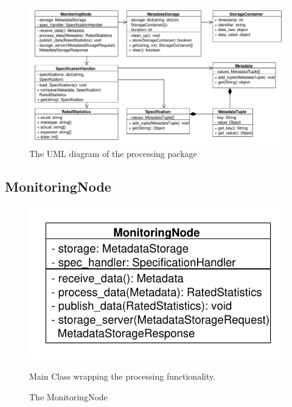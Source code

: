 \begin{figure}[!ht]
\begin{center}
\includegraphics[width=1.0\linewidth]{./diagram_pictures/processing.pdf}
\caption{The UML diagram of the processing package}
\end{center}
\end{figure}

\mbox{}

\newpage

\subsection{MonitoringNode}
\begin{figure}[htbp]
	\begin{minipage}[t]{7cm}
		\vspace{0pt}
		\centering
		\includegraphics[scale=0.6]{./diagram_pictures/MonitoringNode.pdf}
		\caption{The MonitoringNode}
	\end{minipage}
	\hfill
	\begin{minipage}[t]{8cm}
		\vspace{10pt}
		Main Class wrapping the processing functionality.
	\end{minipage}
\end{figure}

